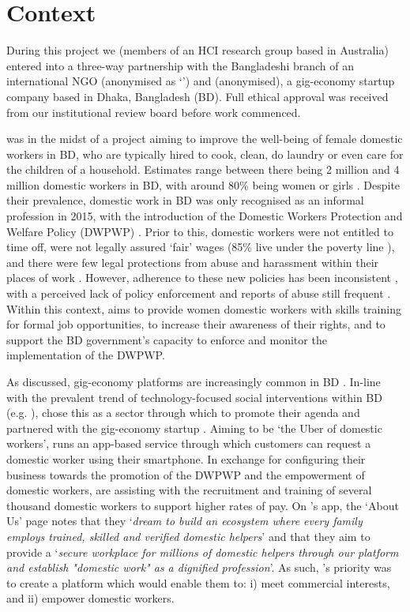 \section{Context}

During this project we (members of an HCI research group based in Australia) entered into a three-way partnership with the Bangladeshi branch of an international NGO (anonymised as `\NGO{}') and \PC{} (anonymised), a gig-economy startup company based in Dhaka, Bangladesh (BD). Full ethical approval was received from our institutional review board before work commenced.

\NGO{} was in the midst of a project aiming to improve the well-being of female domestic workers in BD, who are typically hired to cook, clean, do laundry or even care for the children of a household. Estimates range between there being 2 million \cite{DWRN2011} and 4 million \cite{Ashraf2019} domestic workers in BD, with around 80\% being women or girls \cite{Ashraf2019}. Despite their prevalence, domestic work in BD was only recognised as an informal profession in 2015, with the introduction of the Domestic Workers Protection and Welfare Policy (DWPWP) \cite{Islam2017}. Prior to this, domestic workers were not entitled to time off, were not legally assured `fair' wages (85\% live under the poverty line \cite{BILS2015}), and there were few legal protections from abuse and harassment within their places of work \cite{IDWF2015}. However, adherence to these new policies has been inconsistent \cite{islam2016}, with a perceived lack of policy enforcement and reports of abuse still frequent \cite{DailyStar2018}. Within this context, \NGO{} aims to provide women domestic workers with skills training for formal job opportunities, to increase their awareness of their rights, and to support the BD government's capacity to enforce and monitor the implementation of the DWPWP. 

As discussed, gig-economy platforms are increasingly common in BD \cite{Ahmed2020}. In-line with the prevalent trend of technology-focused social interventions within BD (e.g. \cite{hasnayen2016, Faroqi2019}), \NGO{} chose this as a sector through which to promote their agenda and partnered with the gig-economy startup \PC{}. Aiming to be `the Uber of domestic workers', \PC{} runs an app-based service through which customers can request a domestic worker using their smartphone. In exchange for configuring their business towards the promotion of the DWPWP and the empowerment of domestic workers, \NGO{} are assisting \PC{} with the recruitment and training of several thousand domestic workers to support higher rates of pay. On \PC{}'s app, the `About Us' page notes that they `\textit{dream to build an ecosystem where every family employs trained, skilled and verified domestic helpers}' and that they aim to provide a `\textit{secure workplace for millions of domestic helpers through our platform and establish "domestic work" as a dignified profession}'. As such, \PC{}'s priority was to create a platform which would enable them to: i) meet commercial interests, and ii) empower domestic workers.

